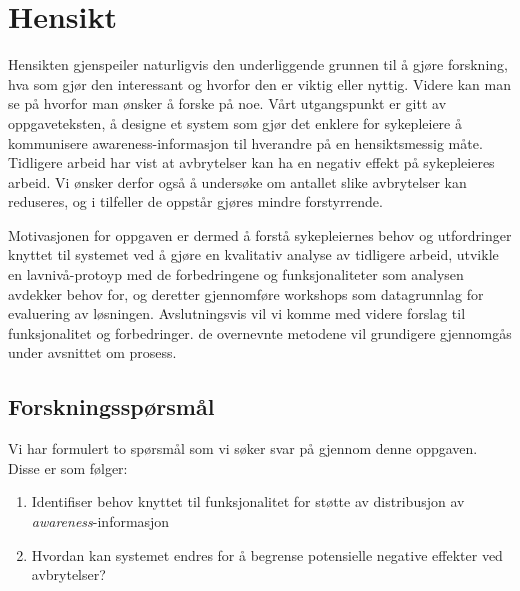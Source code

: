 \section{Hensikt}
\label{chp: hensikt}

Hensikten gjenspeiler naturligvis den underliggende grunnen til å gjøre forskning, hva som gjør den interessant og hvorfor den er viktig eller nyttig. Videre kan man se på hvorfor man ønsker å forske på noe. Vårt utgangspunkt er gitt av oppgaveteksten, å designe et system som gjør det enklere for sykepleiere å kommunisere awareness-informasjon til hverandre på en hensiktsmessig måte. Tidligere arbeid har vist at avbrytelser kan ha en negativ effekt på sykepleieres arbeid. Vi ønsker derfor også å undersøke om antallet slike avbrytelser kan reduseres, og i tilfeller de oppstår gjøres mindre forstyrrende. 

\noindent
Motivasjonen for oppgaven er dermed å forstå sykepleiernes behov og utfordringer knyttet til systemet ved å gjøre en kvalitativ analyse av tidligere arbeid, utvikle en lavnivå-protoyp med de forbedringene og funksjonaliteter som analysen avdekker behov for, og deretter gjennomføre workshops som datagrunnlag for evaluering av løsningen. Avslutningsvis vil vi komme med videre forslag til funksjonalitet og forbedringer. de overnevnte metodene vil grundigere gjennomgås under avsnittet om prosess. 

\subsection{Forskningsspørsmål}
Vi har formulert to spørsmål som vi søker svar på gjennom denne oppgaven. Disse er som følger:

\begin{enumerate}
\item Identifiser behov knyttet til funksjonalitet for støtte av distribusjon av \emph{awareness}-informasjon
\item Hvordan kan systemet endres for å begrense potensielle negative effekter ved avbrytelser?
\end{enumerate}

